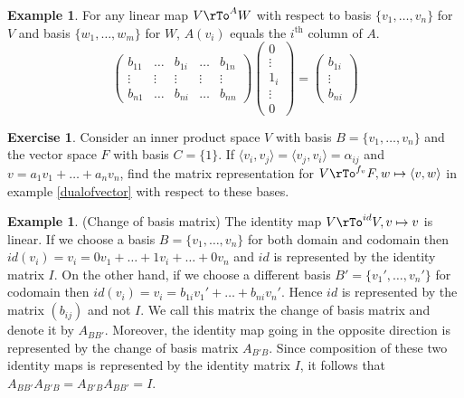 \documentclass[12pt]{amsart}
\theoremstyle{definition}
\newtheorem{example}[theorem]{Example}
\newtheorem{exercise}[theorem]{Exercise}
\begin{document}
\begin{example}\label{basisvectorsmaptocolumns} For any linear map $V \rTo^{A} W$ with respect to basis $\{v_1, \dots, v_n\}$ for $V$ and basis $\{w_1, \dots, w_m\}$ for $W$, $A(v_i)$ equals the $i^{\text{th}}$ column of $A$.
$$\left(\begin{array}{ccccc} b_{11} & \dots & b_{1i} & \dots & b_{1n} \\ \vdots & \vdots & \vdots & \vdots & \vdots \\ b_{n1} & \dots & b_{ni} & \dots & b_{nn} \end{array}\right)\left(\begin{array}{c} 0 \\ \vdots \\ 1_i \\ \vdots \\ 0 \end{array}\right) = \left(\begin{array}{c} b_{1i} \\ \vdots \\ b_{ni} \end{array}\right)$$
\end{example}

\begin{exercise}\label{} Consider an inner product space $V$ with basis $B = \{v_1, \dots, v_n\}$ and the vector space $F$ with basis $C = \{1\}$. If $\langle v_i, v_j \rangle = \langle v_j, v_i \rangle = \alpha_{ij}$ and $v = a_1v_1 + \ldots + a_nv_n$, find the matrix representation for $V \rTo^{f_v} F, w \mapsto \langle v, w \rangle$ in example \ref{dualofvector} with respect to these bases.
\end{exercise}

\begin{example}\label{changeofbasismatrix} (Change of basis matrix) The identity map $V \rTo^{id} V, v \mapsto v$ is linear. If we choose a basis $B = \{v_1, \dots, v_n\}$ for both domain and codomain then $id(v_i) = v_i = 0v_1 + \ldots + 1v_i + \ldots + 0v_n$ and $id$ is represented by the identity matrix $I$. On the other hand, if we choose a different basis $B' = \{v_1', \dots, v_n'\}$ for codomain then $id(v_i) = v_i = b_{1i}v_1' + \ldots + b_{ni}v_n'$. Hence $id$ is represented by the matrix $(b_{ij})$ and not $I$. We call this matrix the change of basis matrix and denote it by $A_{BB'}$. Moreover, the identity map going in the opposite direction is represented by the change of basis matrix $A_{B'B}$. Since composition of these two identity maps is represented by the identity matrix $I$, it follows that $A_{BB'} A_{B'B} = A_{B'B}A_{BB'} = I$.
\end{example}
\end{document}

